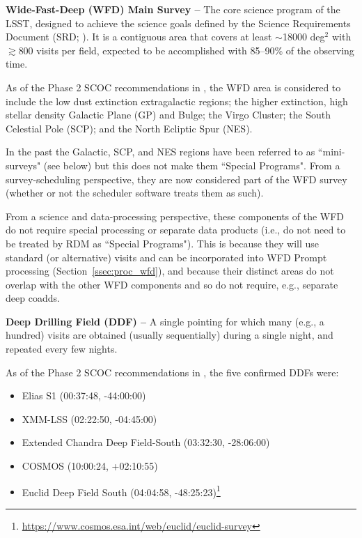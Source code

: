 \textbf{Wide-Fast-Deep (WFD) Main Survey -- }
The core science program of the LSST, designed to achieve the science 
goals defined by the Science Requirements Document (SRD; ).
It is a contiguous area that covers at least $\sim$18000 deg$^2$ with 
$\gtrsim$800 visits per field, expected to be accomplished with 85--90\% 
of the observing time.

As of the Phase 2 SCOC recommendations in , the WFD area 
is considered to include the low dust extinction extragalactic regions; 
the higher extinction, high stellar density Galactic Plane (GP) and Bulge; the 
Virgo Cluster; the South Celestial Pole (SCP); and the North Ecliptic Spur 
(NES). 

In the past the Galactic, SCP, and NES regions have been referred to as 
``mini-surveys" (see below) but this does not make them ``Special Programs". 
From a survey-scheduling perspective, they are now considered part of the 
WFD survey (whether or not the scheduler software treats them as such).

From a science and data-processing perspective, these components of the 
WFD do not require special processing or separate data products 
(i.e., do not need to be treated by RDM as ``Special Programs").
This is because they will use standard (or alternative) visits and can
be incorporated into WFD Prompt processing (Section~\ref{ssec:proc_wfd}), 
and because their distinct areas do not overlap with the other WFD components 
and so do not require, e.g., separate deep coadds. 


\textbf{Deep Drilling Field (DDF) -- }
A single pointing for which many (e.g., a hundred) visits are obtained 
(usually sequentially) during a single night, and repeated every few 
nights.

As of the Phase 2 SCOC recommendations in , the five 
confirmed DDFs were:

\begin{itemize}
\item Elias S1 (00:37:48, -44:00:00)
\item XMM-LSS (02:22:50, -04:45:00)
\item Extended Chandra Deep Field-South (03:32:30, -28:06:00)
\item COSMOS (10:00:24, +02:10:55)
\item Euclid Deep Field South  (04:04:58, -48:25:23)\footnote{\url{https://www.cosmos.esa.int/web/euclid/euclid-survey}}
\end{itemize}

